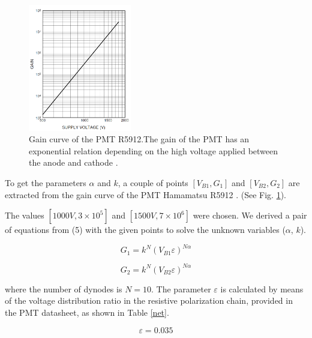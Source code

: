 \documentclass[letterpaper, 10 pt, conference]{ieeeconf}  %
\begin{document}
\begin{figure}[h!]
\begin{center}
\includegraphics[width=0.4\textwidth]{Figures/Gain_curve}
\caption{Gain curve of the PMT R5912.The gain of the PMT has an exponential relation depending on the high voltage applied between the anode and cathode \cite{Hamamatsu2019}.}
\label{Gain_curve}
\end{center}
\end{figure}

To get the parameters $\alpha$ and $k$, a couple of points $[V_{B1}, G_1]$ and $[V_{B2}, G_2]$ are extracted from the gain curve of the PMT Hamamatsu R5912 \cite{Hamamatsu2019}. (See Fig. \ref{Gain_curve}).

The values $[1000 V, 3 \times 10^5 ]$ and $[1500 V, 7 \times 10^6]$ were chosen. We derived a pair of equations from (5) with the given points to solve the unknown variables ($\alpha$, $k$).

\begin{equation}
G_{1} = k^N (V_{B1} \varepsilon)^{N \alpha}
\label{eq:gain1}
\end{equation}

\begin{equation}
G_{2} = k^N (V_{B2} \varepsilon)^{N \alpha}
\label{eq:gain2}
\end{equation}

\noindent where the number of dynodes is $N=10$. The parameter $\varepsilon$ is calculated by means of the voltage distribution ratio in the resistive polarization chain, provided in the PMT datasheet, as shown in Table \ref{net}.

\begin{equation}
\varepsilon = 0.035
\end{equation}
\end{document}
